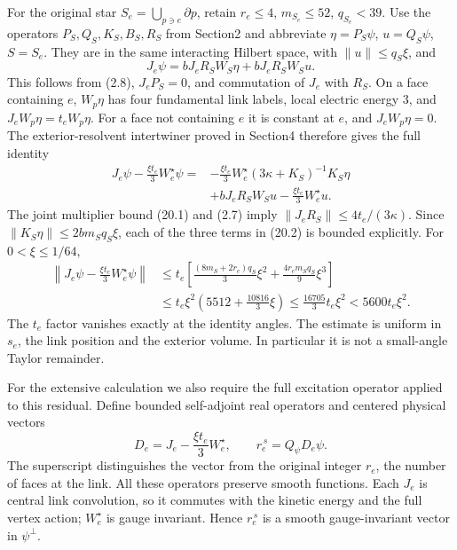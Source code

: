 \documentclass[
]{article}
\begin{document}
For the original star \(S_e=\bigcup_{p\ni e}\partial p\), retain
\(r_e\le4\), \(m_{S_e}\le52\), \(q_{S_e}<39\). Use the operators
\(P_S,Q_S,K_S,B_S,R_S\) from Section2 and abbreviate \(\eta=P_S\psi\),
\(u=Q_S\psi\), \(S=S_e\). They are in the same interacting Hilbert
space, with \(\|u\|\le q_S\xi\), and \[
J_e\psi=bJ_eR_SW_S\eta+bJ_eR_SW_Su .
\] This follows from (2.8), \(J_eP_S=0\), and commutation of \(J_e\)
with \(R_S\). On a face containing \(e\), \(W_p\eta\) has four
fundamental link labels, local electric energy \(3\), and
\(J_eW_p\eta=t_eW_p\eta\). For a face not containing \(e\) it is
constant at \(e\), and \(J_eW_p\eta=0\). The exterior-resolvent
intertwiner proved in Section4 therefore gives the full identity \[
\begin{aligned}
J_e\psi-\frac{\xi t_e}{3}W_e^\star\psi
={}&-\frac{\xi t_e}{3}W_e^\star
       (3\kappa+K_S)^{-1}K_S\eta\\
 &+bJ_eR_SW_Su-\frac{\xi t_e}{3}W_e^\star u .
\end{aligned}                                                   \tag{20.2}
\] The joint multiplier bound (20.1) and (2.7) imply
\(\|J_eR_S\|\le4t_e/(3\kappa)\). Since \(\|K_S\eta\|\le2bm_Sq_S\xi\),
each of the three terms in (20.2) is bounded explicitly. For
\(0<\xi\le1/64\), \[
\begin{aligned}
\left\|J_e\psi-\frac{\xi t_e}{3}W_e^\star\psi\right\|
&\le t_e\left[
 \frac{(8m_S+2r_e)q_S}{3}\xi^2+
 \frac{4r_em_Sq_S}{9}\xi^3\right]\\
&\le t_e\xi^2\left(5512+\frac{10816}{3}\xi\right)
 \le\frac{16705}{3}t_e\xi^2<5600t_e\xi^2 .
\end{aligned}                                                   \tag{20.3}
\] The \(t_e\) factor vanishes exactly at the identity angles. The
estimate is uniform in \(s_e\), the link position and the exterior
volume. In particular it is not a small-angle Taylor remainder.

For the extensive calculation we also require the full excitation
operator applied to this residual. Define bounded self-adjoint real
operators and centered physical vectors \[
D_e=J_e-\frac{\xi t_e}{3}W_e^\star,\qquad
r_e^{\,s}=Q_\psi D_e\psi .
\] The superscript distinguishes the vector from the original integer
\(r_e\), the number of faces at the link. All these operators preserve
smooth functions. Each \(J_e\) is central link convolution, so it
commutes with the kinetic energy and the full vertex action;
\(W_e^\star\) is gauge invariant. Hence \(r_e^{\,s}\) is a smooth
gauge-invariant vector in \(\psi^\perp\).
\end{document}
